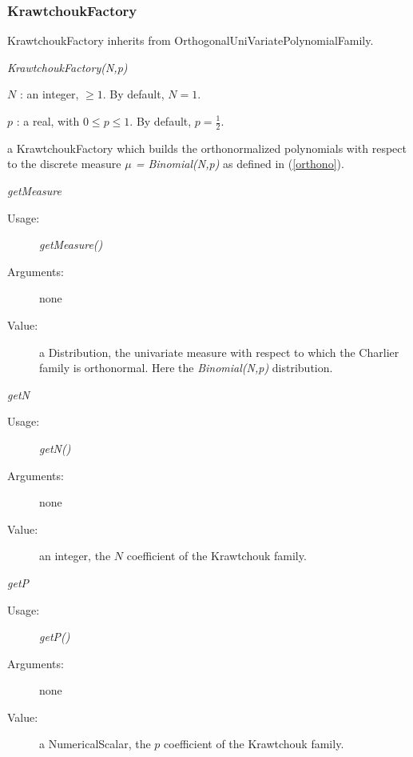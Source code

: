 \newpage
\subsubsection{KrawtchoukFactory}


KrawtchoukFactory inherits from OrthogonalUniVariatePolynomialFamily.

\begin{description}
\item[Usage:] \textit{KrawtchoukFactory(N,p)}


\item[Arguments:]   \rule{0pt}{1em}
\begin{description}
\item $N$ : an integer, $\geq 1$. By default, $N=1$.
\item $p$ : a real, with $0 \leq p \leq 1$. By default, $p=\displaystyle \frac{1}{2}$.
\end{description}


\item[Value:]  a KrawtchoukFactory which builds the orthonormalized polynomials with respect to the discrete measure \textit{$\mu$ = Binomial(N,p)} as defined in (\ref{orthono}).

\item[Some methods :]  \rule{0pt}{1em}


\begin{description}
\item \textit{getMeasure}
\begin{description}
\item[Usage:] \textit{getMeasure()}
\item[Arguments:] none
\item[Value:]  a Distribution, the univariate measure with respect to which the Charlier family is orthonormal. Here the \textit{Binomial(N,p)} distribution.
\end{description}
\bigskip

\item \textit{getN}
\begin{description}
\item[Usage:] \textit{getN()}
\item[Arguments:] none
\item[Value:]  an integer, the $N$ coefficient of the Krawtchouk family.
\end{description}
\bigskip

\item \textit{getP}
\begin{description}
\item[Usage:] \textit{getP()}
\item[Arguments:] none
\item[Value:]  a NumericalScalar, the $p$ coefficient of the Krawtchouk family.
\end{description}

\end{description}
\end{description}


